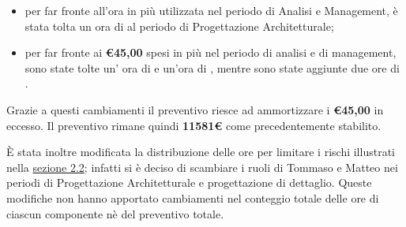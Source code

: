 \begin{itemize}
	\item per far fronte all'ora in più utilizzata nel periodo di Analisi e Management, è stata tolta un ora di \RES{} al periodo di Progettazione Architetturale;
	\item per far fronte ai \textbf{\euro45,00} spesi in più nel periodo di analisi e di management, sono state tolte un' ora di \AM{} e un'ora di \AN, mentre sono state aggiunte due ore di \VER.
\end{itemize}

Grazie a questi cambiamenti il preventivo riesce ad ammortizzare i \textbf{\euro45,00} in eccesso. Il preventivo rimane quindi \textbf{11581\euro} come precedentemente stabilito.

È stata inoltre modificata la distribuzione delle ore per limitare i rischi illustrati nella \hyperref[sez2.2]{sezione 2.2}; infatti si è deciso di scambiare i ruoli di Tommaso e Matteo nei periodi di Progettazione Architetturale e progettazione di dettaglio. Queste modifiche non hanno apportato cambiamenti nel conteggio totale delle ore di ciascun componente nè del preventivo totale.